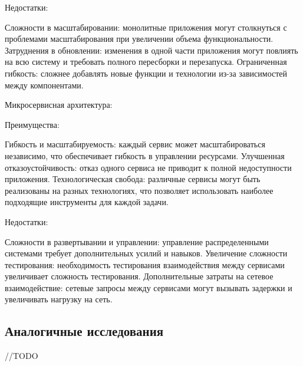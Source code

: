    Недостатки:
    
        Сложности в масштабировании: монолитные приложения могут столкнуться с проблемами масштабирования при увеличении объема функциональности.
        Затруднения в обновлении: изменения в одной части приложения могут повлиять на всю систему и требовать полного пересборки и перезапуска.
        Ограниченная гибкость: сложнее добавлять новые функции и технологии из-за зависимостей между компонентами.
    
    Микросервисная архитектура:
    
    Преимущества:
    
        Гибкость и масштабируемость: каждый сервис может масштабироваться независимо, что обеспечивает гибкость в управлении ресурсами.
        Улучшенная отказоустойчивость: отказ одного сервиса не приводит к полной недоступности приложения.
        Технологическая свобода: различные сервисы могут быть реализованы на разных технологиях, что позволяет использовать наиболее подходящие инструменты для каждой задачи.
    
    Недостатки:
    
        Сложности в развертывании и управлении: управление распределенными системами требует дополнительных усилий и навыков.
        Увеличение сложности тестирования: необходимость тестирования взаимодействия между сервисами увеличивает сложность тестирования.
        Дополнительные затраты на сетевое взаимодействие: сетевые запросы между сервисами могут вызывать задержки и увеличивать нагрузку на сеть.


\subsection{Аналогичные исследования}
    //TODO
    
        
\clearpage